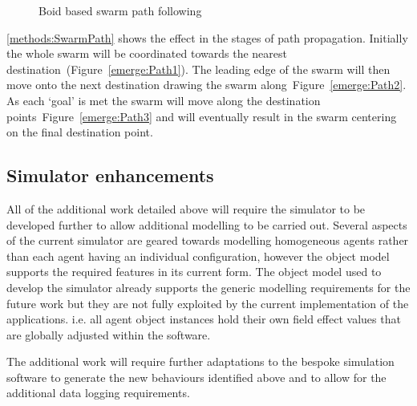 \begin{figure}[H]
\centering
{}
\caption{Boid based swarm path following}
\label{methods:SwarmPath}
\end{figure}

\autoref{methods:SwarmPath} shows the effect in the stages of path propagation. Initially the whole swarm will be coordinated towards the nearest destination~(Figure~\autoref{emerge:Path1}). The leading edge of the swarm will then move onto the next destination drawing the swarm along~Figure~\autoref{emerge:Path2}. As each `goal' is met the swarm will move along the destination points~Figure~\autoref{emerge:Path3} and will eventually result in the swarm centering on the final destination point.

\subsection{Simulator enhancements}
All of the additional work detailed above will require the simulator to be developed further to allow additional modelling to be carried out. Several aspects of the current simulator are geared towards modelling homogeneous agents rather than each agent having an individual configuration, however the object model supports the required features in its current form. The object model used to develop the simulator already supports the generic modelling requirements for the future work but they are not fully exploited by the current implementation of the applications. i.e. all agent object instances hold their own field effect values that are globally adjusted within the software.

The additional work will require further adaptations to the bespoke simulation software to generate the new behaviours identified above and to allow for the additional data logging requirements.
